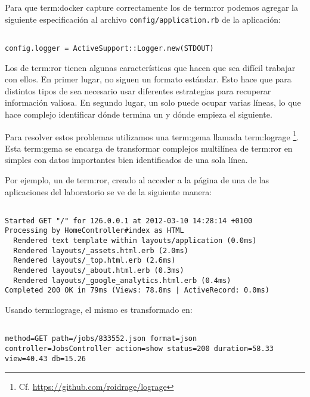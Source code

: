 Para que \gls{term:docker} capture correctamente los  de \gls{term:ror}
podemos agregar la siguiente especificación al archivo
\texttt{config/application.rb} de la aplicación:

\begin{lstlisting}

config.logger = ActiveSupport::Logger.new(STDOUT)

\end{lstlisting}

Los  de \gls{term:ror} tienen algunas características que hacen que sea
difícil trabajar con ellos. En primer lugar, no siguen un formato estándar.
Esto hace que para distintos tipos de  sea necesario usar diferentes
estrategias para recuperar información valiosa. En segundo lugar, un solo
 puede ocupar varias líneas, lo que hace complejo identificar dónde termina
un  y dónde empieza el siguiente.

Para resolver estos problemas utilizamos una \gls{term:gema} llamada \gls{term:lograge}
\footnote{Cf. \url{https://github.com/roidrage/lograge}}. Esta \gls{term:gema} se encarga
de transformar complejos  multilínea de \gls{term:ror} en simples  con
datos importantes bien identificados de una sola línea.

Por ejemplo, un  de \gls{term:ror}, creado al acceder a la página 
de una de las aplicaciones del laboratorio se ve de la siguiente manera:

\begin{lstlisting}

Started GET "/" for 126.0.0.1 at 2012-03-10 14:28:14 +0100
Processing by HomeController#index as HTML
  Rendered text template within layouts/application (0.0ms)
  Rendered layouts/_assets.html.erb (2.0ms)
  Rendered layouts/_top.html.erb (2.6ms)
  Rendered layouts/_about.html.erb (0.3ms)
  Rendered layouts/_google_analytics.html.erb (0.4ms)
Completed 200 OK in 79ms (Views: 78.8ms | ActiveRecord: 0.0ms)

\end{lstlisting}

Usando \gls{term:lograge}, el mismo  es transformado en:

\begin{lstlisting}

method=GET path=/jobs/833552.json format=json controller=JobsController action=show status=200 duration=58.33 view=40.43 db=15.26

\end{lstlisting}

